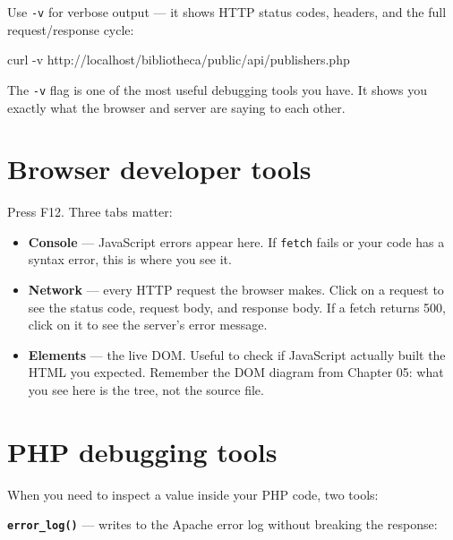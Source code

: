 \documentclass[11pt,a4paper,oneside]{book}
\newenvironment{Shaded}{\begin{snugshade}}{\end{snugshade}}
\newcommand{\KeywordTok}[1]{\textcolor[HTML]{007020}{\textbf{#1}}}
\newcommand{\StringTok}[1]{\textcolor[HTML]{4070A0}{#1}}
\newcommand{\OtherTok}[1]{\textcolor[HTML]{007020}{#1}}
\newcommand{\FunctionTok}[1]{\textcolor[HTML]{06287E}{#1}}
\newcommand{\VariableTok}[1]{\textcolor[HTML]{19177C}{#1}}
\newcommand{\OperatorTok}[1]{\textcolor[HTML]{666666}{#1}}
\newcommand{\ExtensionTok}[1]{#1}
\newcommand{\AttributeTok}[1]{\textcolor[HTML]{7D9029}{#1}}
\newcommand{\NormalTok}[1]{#1}
\providecommand{\tightlist}{%
  \setlength{\itemsep}{0pt}\setlength{\parskip}{0pt}}
\begin{document}
Use \texttt{-v} for verbose output --- it shows HTTP status
codes, headers, and the full request/response cycle:

\begin{Shaded}
\begin{Highlighting}[]
\ExtensionTok{curl} \AttributeTok{{-}v}\NormalTok{ http://localhost/bibliotheca/public/api/publishers.php}
\end{Highlighting}
\end{Shaded}

The \texttt{-v} flag is one of the most useful debugging tools
you have. It shows you exactly what the browser and server are
saying to each other.

\hypertarget{browser-developer-tools}{%
\section{Browser developer tools}\label{browser-developer-tools}}

Press F12. Three tabs matter:

\begin{itemize}
\tightlist
\item
  \textbf{Console} --- JavaScript errors appear here. If
  \texttt{fetch} fails or your code has a syntax error, this is
  where you see it.
\item
  \textbf{Network} --- every HTTP request the browser makes.
  Click on a request to see the status code, request body, and
  response body. If a fetch returns 500, click on it to see the
  server's error message.
\item
  \textbf{Elements} --- the live DOM. Useful to check if
  JavaScript actually built the HTML you expected. Remember the
  DOM diagram from Chapter 05: what you see here is the tree, not
  the source file.
\end{itemize}

\hypertarget{php-debugging-tools}{%
\section{PHP debugging tools}\label{php-debugging-tools}}

When you need to inspect a value inside your PHP code, two tools:

\textbf{\texttt{error\_log()}} --- writes to the Apache error log
without breaking the response:

\begin{Shaded}
\end{Shaded}
\end{document}
